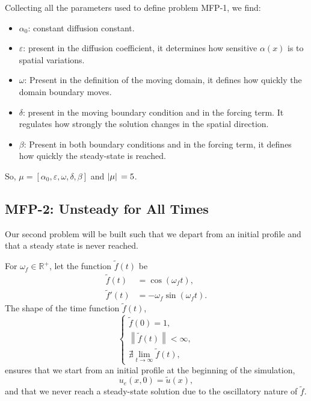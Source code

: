 \documentclass[../main.tex]{subfiles}
\begin{document}
Collecting all the parameters used to define problem MFP-1, we find:
\begin{itemize}
    \item $\alpha_0$: constant diffusion constant. 
    \item $\varepsilon$: present in the diffusion coefficient, it determines how sensitive $\alpha(x)$ is to spatial variations. 
    \item $\omega$: Present in the definition of the moving domain, it defines how quickly the domain boundary moves.
    \item $\delta$: present in the moving boundary condition and in the forcing term. 
    It regulates how strongly the solution changes in the spatial direction.
    \item $\beta$: Present in both boundary conditions and in the forcing term, it defines how quickly the steady-state is reached.
\end{itemize}
So, $\mu = [\alpha_0, \varepsilon, \omega, \delta, \beta]$ and $\abs*{\mu} = 5$.

\subsection{MFP-2: Unsteady for All Times}
Our second problem will be built such that we depart from an initial profile and that a steady state is never reached. 

For $\omega_f \in \mathbb{R}^{+}$, let the function $\tilde{f}(t)$ be
\begin{subequations}
    \begin{align}
        \tilde{f}(t) &= \cos{(\omega_f t)}, \\ 
        \tilde{f}'(t) &= -\omega_f \sin{(\omega_f t)}.
    \end{align}    
\end{subequations}
The shape of the time function $\tilde{f}(t)$,
\begin{equation*}
    \begin{cases}
    \tilde{f}(0) = 1, \\ 
    \left\|\tilde{f}(t)\right\| < \infty, \\ 
    \nexists \lim_{t \rightarrow \infty} \tilde{f}(t),
    \end{cases}
\end{equation*}
ensures that we start from an initial profile at the beginning of the simulation,
\begin{equation}
    u_e(x,0) = \tilde{u}(x),
\end{equation}
and that we never reach a steady-state solution due to the oscillatory nature of $\tilde{f}$.
\end{document}
